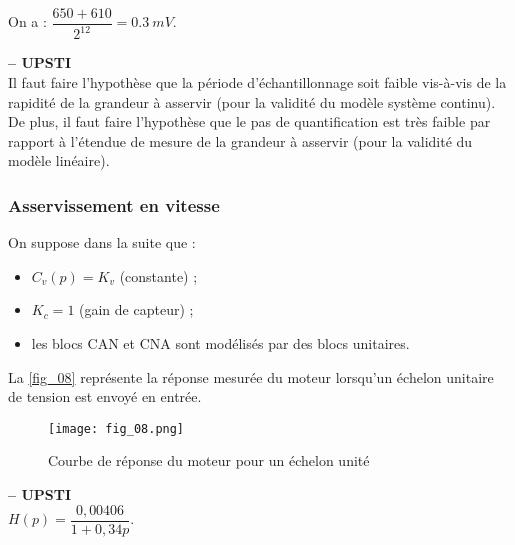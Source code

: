 \ifprof
\begin{corrige}
On  a : $\dfrac{650+610}{2^12} = \SI{0,3}{mV}$.
\end{corrige}
\else
\fi

\ifprof
\begin{corrige} \textbf{ -- UPSTI}\\
 Il faut faire l’hypothèse que la période d’échantillonnage soit faible vis-à-vis de la rapidité 
de la grandeur à asservir (pour la validité du modèle système continu). De plus, il faut faire 
l’hypothèse que le pas de quantification est très faible par rapport à l’étendue de mesure de la 
grandeur à asservir (pour la validité du modèle linéaire).
\end{corrige}
\else
\fi

\subsubsection{Asservissement en vitesse}

On suppose dans la suite que :
\begin{itemize}
\item $C_v ( p)=K_v$ (constante) ;
\item $K_c =1$ (gain de capteur) ;
\item  les blocs CAN et CNA sont modélisés par des blocs unitaires.
\end{itemize}

La \autoref{fig_08} représente la réponse mesurée du moteur lorsqu’un échelon unitaire de tension est
envoyé en entrée.

\begin{figure}[H]
\centering
\texttt{[image: fig\_08.png]}
\caption{Courbe de réponse du moteur pour un échelon unité\label{fig_08}}
\end{figure}

\ifprof
\begin{corrige}\textbf{ -- UPSTI}\\ 
$H(p)=\dfrac{0,00406}{1+0,34p}$.
\end{corrige}
\else
\fi


\ifprof
\begin{corrige}
\end{corrige}
\else
\fi

